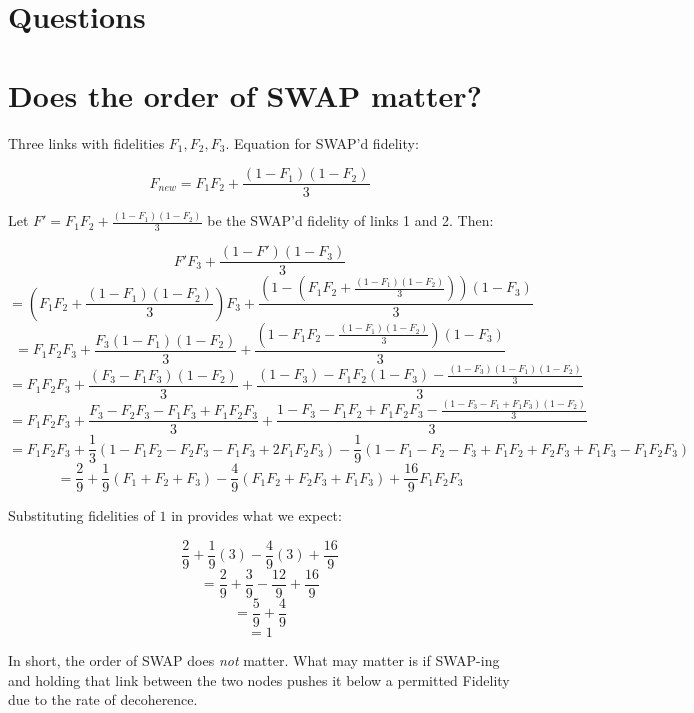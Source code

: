 \documentclass{article}
\begin{document}
\section{Questions}


\section{Does the order of SWAP matter?}
Three links with fidelities $F_1,F_2,F_3$. Equation for SWAP'd fidelity:

$$F_{new} = F_1F_2 + \frac{(1-F_1)(1-F_2)}{3}$$

Let $F' = F_1 F_2 + \frac{(1-F_1)(1-F_2)}{3}$ be the SWAP'd fidelity of links 1 and 2. Then:

    $$F' F_3 + \frac{(1-F')(1-F_3)}{3}$$
    $$=(F_1 F_2 + \frac{(1-F_1)(1-F_2)}{3})F_3 + \frac{(1-(F_1 F_2 + \frac{(1-F_1)(1-F_2)}{3}))(1-F_3)}{3}$$
    $$=F_1 F_2F_3 + \frac{F_3(1-F_1)(1-F_2)}{3} + \frac{(1-F_1 F_2 - \frac{(1-F_1)(1-F_2)}{3})(1-F_3)}{3}$$
    $$=F_1 F_2F_3 + \frac{(F_3-F_1F_3)(1-F_2)}{3} + \frac{(1-F_3)-F_1 F_2(1-F_3) - \frac{(1-F_3)(1-F_1)(1-F_2)}{3}}{3}$$
    $$=F_1 F_2F_3 + \frac{F_3 - F_2F_3 - F_1F_3 + F_1F_2F_3}{3} + \frac{1-F_3-F_1 F_2+F_1F_2F_3 - \frac{(1-F_3-F_1+F_1F_3)(1-F_2)}{3}}{3}$$
    $$=F_1 F_2F_3 + \frac{1}{3}(1 - F_1F_2 - F_2F_3 - F_1F_3 + 2F_1F_2F_3) - \frac{1}{9}(1 - F_1 - F_2 - F_3 + F_1F_2 + F_2F_3 + F_1F_3 - F_1F_2F_3)$$
    $$=\frac{2}{9} + \frac{1}{9}(F_1 + F_2 + F_3) - \frac{4}{9}(F_1F_2 + F_2F_3 + F_1F_3) + \frac{16}{9}F_1 F_2F_3$$

Substituting fidelities of $1$ in provides what we expect:

$$\frac{2}{9} + \frac{1}{9}(3) - \frac{4}{9}(3) + \frac{16}{9}$$
$$=\frac{2}{9} + \frac{3}{9} - \frac{12}{9} + \frac{16}{9}$$
$$=\frac{5}{9} + \frac{4}{9}$$
$$=1$$

In short, the order of SWAP does \emph{not} matter.  What may matter is if SWAP-ing and holding that link between the two nodes pushes it below a permitted Fidelity due to the rate of decoherence.
\end{document}

